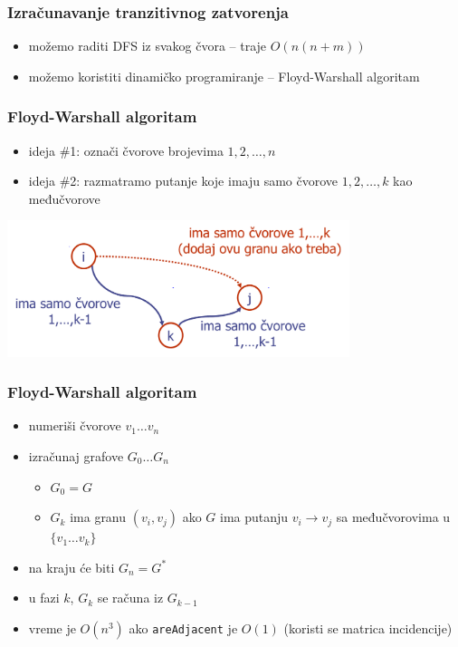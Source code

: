 \documentclass[compress]{beamer}
\begin{document}
\begin{frame}[fragile]
  \frametitle{Izračunavanje tranzitivnog zatvorenja}
  \begin{itemize}
    \item možemo raditi DFS iz svakog čvora -- traje $O(n(n+m))$
    \item možemo koristiti dinamičko programiranje -- Floyd-Warshall 
      algoritam
  \end{itemize}
\end{frame}

\begin{frame}[fragile]
  \frametitle{Floyd-Warshall algoritam}
  \begin{itemize}
    \item ideja \#1: označi čvorove brojevima $1, 2, \ldots, n$
    \item ideja \#2: razmatramo putanje koje imaju samo čvorove $1, 2, 
      \ldots, k$ kao međučvorove
  \end{itemize}
  \begin{center}
    \includegraphics[width=10cm]{asp-14-pic36.png}
  \end{center}
\end{frame}

\begin{frame}[fragile]
  \frametitle{Floyd-Warshall algoritam}
  \begin{itemize}
    \item numeriši čvorove $v_1 \ldots v_n$
    \item izračunaj grafove $G_0 \ldots G_n$ 
    \begin{itemize}
      \item $G_0 = G$
      \item $G_k$ ima granu $(v_{i},v_{j})$ ako $G$ ima putanju 
        $v_{i}\rightarrow v_{j}$ sa međučvorovima u $\{v_{1}\ldots 
        v_{k}\}$
    \end{itemize}
    \item na kraju će biti $G_{n} = G^{*}$
    \item u fazi $k$, $G_{k}$ se računa iz $G_{k-1}$
    \item vreme je $O(n^3)$ ako \texttt{areAdjacent} je $O(1)$
      (koristi se matrica incidencije)
  \end{itemize}
\end{frame}
\end{document}
